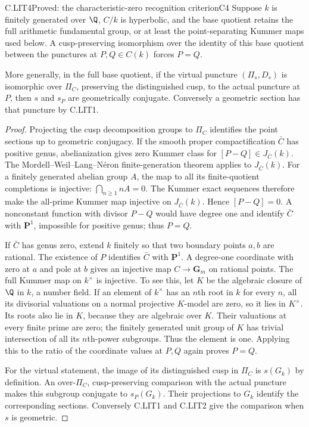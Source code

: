 \begin{claim}{C.LIT4}{Proved: the characteristic-zero recognition criterion}{C4}
Suppose $k$ is finitely generated over $\Q$, $C/k$ is hyperbolic,
and the base quotient retains the full arithmetic fundamental group,
or at least the point-separating Kummer maps used below. A cusp-preserving
isomorphism over the identity of this base quotient between the
punctures at $P,Q\in C(k)$ forces $P=Q$.

More generally, in the full base quotient, if the virtual puncture
$(\Pi_s,D_s)$ is isomorphic over $\Pi_C$, preserving the distinguished
cusp, to the actual puncture at $P$, then $s$ and $s_P$ are geometrically
conjugate. Conversely a geometric section has that puncture by C.LIT1.
\end{claim}
\begin{proof}
Projecting the cusp decomposition groups to $\Pi_C$ identifies the
point sections up to geometric conjugacy. If the smooth proper
compactification $\bar C$ has positive genus, abelianization gives
zero Kummer class for $[P-Q]\in J_{\bar C}(k)$. The
Mordell--Weil--Lang--N\'eron finite-generation theorem applies to
$J_{\bar C}(k)$. For a finitely generated
abelian group $A$, the map to all its finite-quotient completions is
injective: $\bigcap_{n\ge1}nA=0$. The Kummer exact sequences therefore
make the all-prime Kummer map injective on $J_{\bar C}(k)$. Hence $[P-Q]=0$.
A nonconstant function with divisor $P-Q$ would have degree one and
identify $\bar C$ with $\mathbf P^1$, impossible for positive genus; thus
$P=Q$.

If $\bar C$ has genus zero, extend $k$ finitely so that two boundary
points $a,b$ are rational. The existence of $P$ identifies $\bar C$
with $\mathbf P^1$. A degree-one coordinate with zero at $a$ and pole
at $b$ gives an injective map $C\to\mathbf G_m$ on rational points.
The full Kummer map on $k^\times$ is injective. To see this, let $K$
be the algebraic closure of $\Q$ in $k$, a number field. If an element
of $k^\times$ has an $n$th root in $k$ for every $n$, all its divisorial
valuations on a normal projective $K$-model are zero, so it lies in
$K^\times$. Its roots also lie in $K$, because they are algebraic over
$K$. Their valuations at every finite prime are zero; the finitely
generated unit group of $K$ has trivial intersection of all its
$n$th-power subgroups. Thus the element is one. Applying this to the
ratio of the coordinate values at $P,Q$ again proves $P=Q$.

For the virtual statement, the image of its distinguished cusp in
$\Pi_C$ is $s(G_k)$ by definition. An over-$\Pi_C$, cusp-preserving
comparison with the actual puncture makes this subgroup conjugate
to $s_P(G_k)$. Their projections to $G_k$ identify the corresponding
sections. Conversely C.LIT1 and C.LIT2 give the comparison when $s$
is geometric.
\end{proof}

